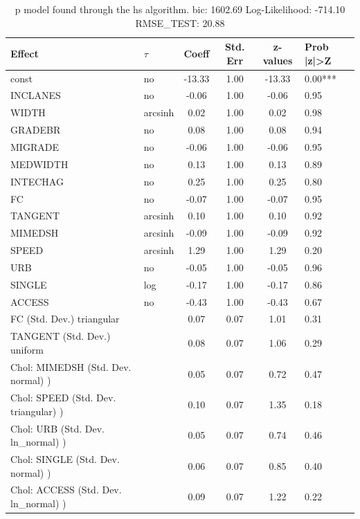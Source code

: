 \begin{table}
	\caption{p model found through the hs algorithm. bic: 1602.69 Log-Likelihood: -714.10 RMSE_TEST: 20.88}
	\begin{center}
		\begin{tabular}{|l|l|c|c|c|l|}
			\hline
			Effect & $\tau$ & Coeff & Std. Err & z-values & Prob |z|>Z \\
			\hline
			const & no & -13.33 & 1.00 & -13.33 & 0.00*** \\
			\hline
			INCLANES & no & -0.06 & 1.00 & -0.06 & 0.95 \\
			\hline
			WIDTH & arcsinh & 0.02 & 1.00 & 0.02 & 0.98 \\
			\hline
			GRADEBR & no & 0.08 & 1.00 & 0.08 & 0.94 \\
			\hline
			MIGRADE & no & -0.06 & 1.00 & -0.06 & 0.95 \\
			\hline
			MEDWIDTH & no & 0.13 & 1.00 & 0.13 & 0.89 \\
			\hline
			INTECHAG & no & 0.25 & 1.00 & 0.25 & 0.80 \\
			\hline
			FC & no & -0.07 & 1.00 & -0.07 & 0.95 \\
			\hline
			TANGENT & arcsinh & 0.10 & 1.00 & 0.10 & 0.92 \\
			\hline
			MIMEDSH & arcsinh & -0.09 & 1.00 & -0.09 & 0.92 \\
			\hline
			SPEED & arcsinh & 1.29 & 1.00 & 1.29 & 0.20 \\
			\hline
			URB & no & -0.05 & 1.00 & -0.05 & 0.96 \\
			\hline
			SINGLE & log & -0.17 & 1.00 & -0.17 & 0.86 \\
			\hline
			ACCESS & no & -0.43 & 1.00 & -0.43 & 0.67 \\
			\hline
			FC (Std. Dev.) triangular &  & 0.07 & 0.07 & 1.01 & 0.31 \\
			\hline
			TANGENT (Std. Dev.) uniform &  & 0.08 & 0.07 & 1.06 & 0.29 \\
			\hline
			 Chol: MIMEDSH (Std. Dev. normal) ) &  & 0.05 & 0.07 & 0.72 & 0.47 \\
			\hline
			 Chol: SPEED (Std. Dev. triangular) ) &  & 0.10 & 0.07 & 1.35 & 0.18 \\
			\hline
			 Chol: URB (Std. Dev. ln_normal) ) &  & 0.05 & 0.07 & 0.74 & 0.46 \\
			\hline
			 Chol: SINGLE (Std. Dev. normal) ) &  & 0.06 & 0.07 & 0.85 & 0.40 \\
			\hline
			 Chol: ACCESS (Std. Dev. ln_normal) ) &  & 0.09 & 0.07 & 1.22 & 0.22 \\

\end{tabular}
\end{center}
\end{table}
